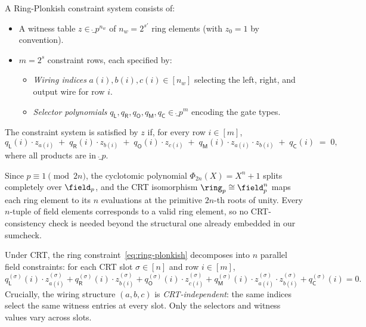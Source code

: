 \begin{definition}
\label{def:ring-plonkish}
A Ring-Plonkish constraint system consists of:
\begin{itemize}
    \item A witness table $z \in \ring_p^{n_w}$ of $n_w = 2^{s'}$ ring elements (with $z_0 = 1$ by convention).
    \item $m = 2^s$ constraint rows, each specified by:
    \begin{itemize}
        \item \emph{Wiring indices} $a(i), b(i), c(i) \in [n_w]$ selecting the left, right, and output wire for row $i$.
        \item \emph{Selector polynomials} $q_\mathsf{L}, q_\mathsf{R}, q_\mathsf{O}, q_\mathsf{M}, q_\mathsf{C} \in \ring_p^m$ encoding the gate types.
    \end{itemize}
\end{itemize}
The constraint system is satisfied by $z$ if, for every row $i \in [m]$,
\begin{equation}\label{eq:ring-plonkish}
    q_\mathsf{L}(i) \cdot z_{a(i)} \;+\; q_\mathsf{R}(i) \cdot z_{b(i)} \;+\; q_\mathsf{O}(i) \cdot z_{c(i)} \;+\; q_\mathsf{M}(i) \cdot z_{a(i)} \cdot z_{b(i)} \;+\; q_\mathsf{C}(i) \;=\; 0,
\end{equation}
where all products are in $\ring_p$.
\end{definition}

Since $p \equiv 1 \pmod{2n}$, the cyclotomic polynomial $\Phi_{2n}(X) = X^n + 1$ splits completely over $\field_p$, and the CRT isomorphism $\ring_p \cong \field_p^n$ maps each ring element to its $n$ evaluations at the primitive $2n$-th roots of unity.
Every $n$-tuple of field elements corresponds to a valid ring element, so no CRT-consistency check is needed beyond the structural one already embedded in our sumcheck.

Under CRT, the ring constraint~\eqref{eq:ring-plonkish} decomposes into $n$ parallel field constraints: for each CRT slot $\sigma \in [n]$ and row $i \in [m]$,
\begin{equation}\label{eq:plonkish-crt}
    q_\mathsf{L}^{(\sigma)}(i) \cdot z_{a(i)}^{(\sigma)} + q_\mathsf{R}^{(\sigma)}(i) \cdot z_{b(i)}^{(\sigma)} + q_\mathsf{O}^{(\sigma)}(i) \cdot z_{c(i)}^{(\sigma)} + q_\mathsf{M}^{(\sigma)}(i) \cdot z_{a(i)}^{(\sigma)} \cdot z_{b(i)}^{(\sigma)} + q_\mathsf{C}^{(\sigma)}(i) = 0.
\end{equation}
Crucially, the wiring structure $(a, b, c)$ is \emph{CRT-independent}: the same indices select the same witness entries at every slot. Only the selectors and witness values vary across slots.

